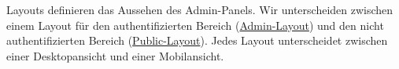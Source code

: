 Layouts definieren das Aussehen des Admin-Panels.
Wir unterscheiden zwischen einem Layout für den authentifizierten Bereich (\hyperref[AP_Admin_Layout]{Admin-Layout}) und den nicht authentifizierten Bereich (\hyperref[AP_Public_Layout]{Public-Layout}).
Jedes Layout unterscheidet zwischen einer Desktopansicht und einer Mobilansicht. 
